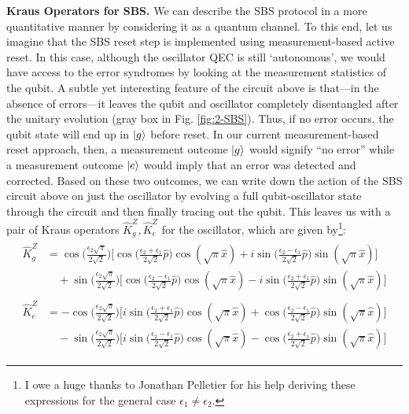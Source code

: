 \noindent \textbf{Kraus Operators for SBS.} We can describe the SBS protocol in a more quantitative manner by considering it as a quantum channel. To this end, let us imagine that the SBS reset step is implemented using measurement-based active reset. In this case, although the oscillator QEC is still `autonomous', we would have access to the error syndromes by looking at the measurement statistics of the qubit. A subtle yet interesting feature of the circuit above is that---in the absence of errors---it leaves the qubit and oscillator completely disentangled after the unitary evolution (gray box in Fig. \ref{fig:2-SBS}). Thus, if no error occurs, the qubit state will end up in $\lvert g\rangle$ before reset. In our current measurement-based reset approach, then, a measurement outcome $\lvert g\rangle$ would signify ``no error'' while a measurement outcome $\lvert e\rangle$ would imply that an error was detected and corrected. Based on these two outcomes, we can write down the action of the SBS circuit above on just the oscillator by evolving a full qubit-oscillator state through the circuit and then finally tracing out the qubit. This leaves us with a pair of Kraus operators $\hat{K}_g^Z, \hat{K}_e^Z$ for the oscillator, which are given by\footnote{I owe a huge thanks to Jonathan Pelletier for his help deriving these expressions for the general case $\epsilon_1 \neq \epsilon_2$.}:     
\begin{align}
    \begin{split}
        \hat{K}_g^Z &= \cos\bigg(\frac{\epsilon_2 \sqrt{\pi}}{2\sqrt{2}}\bigg)\Bigg[\cos\bigg(\frac{\epsilon_2 + \epsilon_1}{2\sqrt{2}} \hat{p}\bigg)\cos(\sqrt{\pi} \hat{x}) + i\sin\bigg(\frac{\epsilon_2 - \epsilon_1}{2\sqrt{2}} \hat{p}\bigg)\sin(\sqrt{\pi} \hat{x})\Bigg] \\
        &\quad + \sin\bigg(\frac{\epsilon_2 \sqrt{\pi}}{2\sqrt{2}}\bigg)\Bigg[\cos\bigg(\frac{\epsilon_2 - \epsilon_1}{2\sqrt{2}} \hat{p}\bigg)\cos(\sqrt{\pi} \hat{x}) - i\sin\bigg(\frac{\epsilon_2 + \epsilon_1}{2\sqrt{2}} \hat{p}\bigg)\sin(\sqrt{\pi} \hat{x})\Bigg]
    \end{split} \\
    \begin{split}
        \hat{K}_e^Z &= -\cos\bigg(\frac{\epsilon_2 \sqrt{\pi}}{2\sqrt{2}}\bigg)\Bigg[i\sin\bigg(\frac{\epsilon_2 + \epsilon_1}{2\sqrt{2}} \hat{p}\bigg)\cos(\sqrt{\pi} \hat{x}) + \cos\bigg(\frac{\epsilon_2 - \epsilon_1}{2\sqrt{2}} \hat{p}\bigg)\sin(\sqrt{\pi} \hat{x})\Bigg] \\
        &\quad -\sin\bigg(\frac{\epsilon_2 \sqrt{\pi}}{2\sqrt{2}}\bigg)\Bigg[i\sin\bigg(\frac{\epsilon_2 - \epsilon_1}{2\sqrt{2}} \hat{p}\bigg)\cos(\sqrt{\pi} \hat{x}) - \cos\bigg(\frac{\epsilon_2 + \epsilon_1}{2\sqrt{2}} \hat{p}\bigg)\sin(\sqrt{\pi} \hat{x})\Bigg]
    \end{split}
\end{align}
